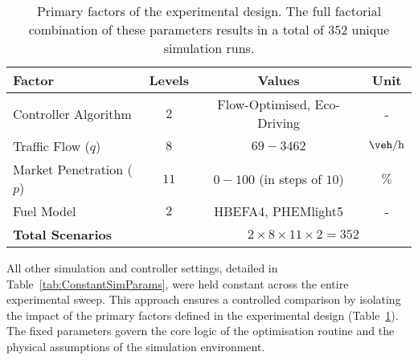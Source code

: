 \begin{table}[htb]
  \centering
  \caption[Experimental Design Matrix]{Primary factors of the experimental design. The full factorial combination of these parameters results in a total of 352 unique simulation runs.}
  \label{tab:ScenarioMatrix}
  \begin{tabular}{l c c c}
    \toprule
    \textbf{Factor} & \textbf{Levels} & \textbf{Values} & \textbf{Unit} \\
    \midrule
    Controller Algorithm & $2$ & Flow-Optimised, Eco-Driving & - \\
    Traffic Flow ($q$) & $8$ & $69-3462$ & $\unit{\veh\per\hour}$ \\
    Market Penetration ($p$) & $11$ & $0-100$ (in steps of $10$) & $\%$ \\
    Fuel Model & $2$ & HBEFA4, PHEMlight5 & - \\
    \midrule
    \multicolumn{2}{l}{\textbf{Total Scenarios}} & \multicolumn{2}{c}{$2 \times 8 \times 11 \times 2 = 352$} \\
    \bottomrule
  \end{tabular}
\end{table}

All other simulation and controller settings, detailed in Table~\ref{tab:ConstantSimParams}, were held constant across the entire experimental sweep. This approach ensures a controlled comparison by isolating the impact of the primary factors defined in the experimental design (Table~\ref{tab:ScenarioMatrix}). The fixed parameters govern the core logic of the optimisation routine and the physical assumptions of the simulation environment.
\mynewline


